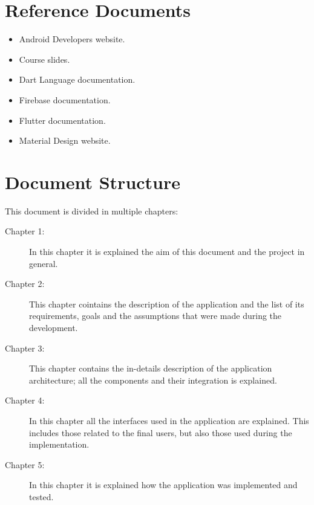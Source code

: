 \section{Reference Documents}
\begin{itemize}
    \item Android Developers website.
    \item Course slides.
    \item Dart Language documentation.
    \item Firebase documentation.
    \item Flutter documentation.
    \item Material Design website. 
\end{itemize}

\section{Document Structure}
This document is divided in multiple chapters:
\begin{description}
    \item[Chapter 1:] In this chapter it is explained the aim of this document and the project in general.
    \item[Chapter 2:] This chapter cointains the description of the application and the list of its requirements, goals and the assumptions that were made during the development.
    \item[Chapter 3:] This chapter contains the in-details description of the application architecture; all the components and their integration is explained.
    \item[Chapter 4:] In this chapter all the interfaces used in the application are explained. This includes those related to the final users, but also those used during the implementation.
    \item[Chapter 5:] In this chapter it is explained how the application was implemented and tested.
\end{description}